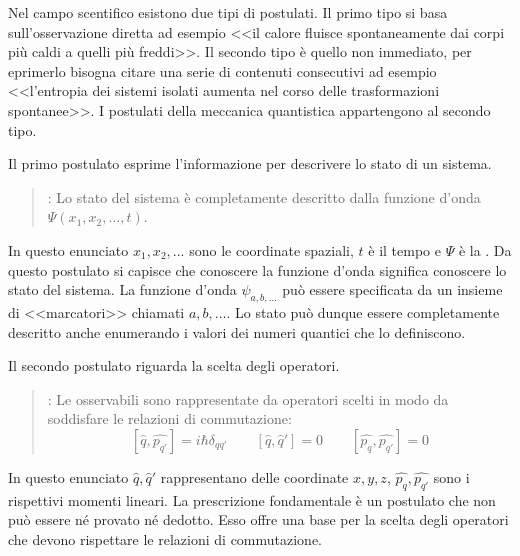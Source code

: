 Nel campo scentifico esistono due tipi di postulati. Il primo tipo si basa sull'osservazione diretta ad esempio <<il calore fluisce spontaneamente dai corpi più caldi a quelli più freddi>>. Il secondo tipo è quello non immediato, per eprimerlo bisogna citare una serie di contenuti consecutivi ad esempio <<l'entropia dei sistemi isolati aumenta nel corso delle trasformazioni spontanee>>. I postulati della meccanica quantistica appartengono al secondo tipo.

Il primo postulato esprime l'informazione per descrivere lo stato di un sistema.
\begin{quote}
: Lo stato del sistema è completamente descritto dalla funzione d'onda $\Psi(x_1, x_2, ..., t)$.
\end{quote}
In questo enunciato $x_1, x_2, ...$ sono le coordinate spaziali, $t$ è il tempo e $\Psi$ è la . Da questo postulato si capisce che conoscere la funzione d'onda significa conoscere lo stato del sistema. La funzione d'onda $\psi_{a, b, ...}$ può essere specificata da un insieme di <<marcatori>> chiamati  $a, b, ...$. Lo stato può dunque essere completamente descritto anche enumerando i valori dei numeri quantici che lo definiscono.

Il secondo postulato riguarda la scelta degli operatori.
\begin{quote}
  : Le osservabili sono rappresentate da operatori scelti in modo da soddisfare le relazioni di commutazione:
  $$ [\hat{q}, \hat{p_{q'}}] = i \hbar \delta_{qq'} \qquad [\hat{q}, \hat{q}'] = 0 \qquad [\hat{p_q}, \hat{p_{q'}}] = 0$$
\end{quote}
In questo enunciato $\hat{q}, \hat{q}'$ rappresentano delle coordinate $x, y, z$, $\hat{p_q}, \hat{p_{q'}}$ sono i rispettivi momenti lineari. La prescrizione fondamentale è un postulato che non può essere né provato né dedotto. Esso offre una base per la scelta degli operatori che devono rispettare le relazioni di commutazione.


